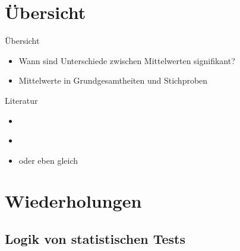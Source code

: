
\section{Übersicht}

\begin{frame}
  {Übersicht}
  \begin{itemize}[<+->]
    \item Wann sind Unterschiede zwischen Mittelwerten signifikant?
    \item Mittelwerte in Grundgesamtheiten und Stichproben
  \end{itemize}
\end{frame}

\begin{frame}
  {Literatur}
  \begin{itemize}
    \item \citet{GravetterWallnau2007}
    \item \citet{Bortz2010}
      \vspace{\baselineskip}
    \item oder eben gleich \citet{Fisher1935a}
  \end{itemize}
\end{frame}


\section{Wiederholungen}


\subsection{Logik von statistischen Tests}

